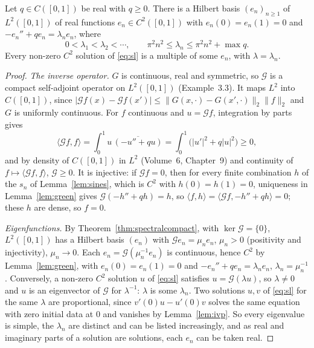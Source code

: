 \begin{theorem}\label{thm:sturm}
Let $q\in C([0,1])$ be real with $q\ge0$. There is a Hilbert basis $(e_n)_{n\ge1}$ of $L^2([0,1])$ of real functions $e_n\in C^2([0,1])$ with $e_n(0)=e_n(1)=0$ and $-e_n''+qe_n=\lambda_ne_n$, where
\[0<\lambda_1<\lambda_2<\cdots,\qquad \pi^2n^2\le\lambda_n\le\pi^2n^2+\max q.\]
Every non-zero $C^2$ solution of \eqref{eq:sl} is a multiple of some $e_n$, with $\lambda=\lambda_n$.
\end{theorem}
\begin{proof}
\emph{The inverse operator.} $G$ is continuous, real and symmetric, so $\mathcal G$ is a compact self-adjoint operator on $L^2([0,1])$ (Example~3.3). It maps $L^2$ into $C([0,1])$, since
$|\mathcal Gf(x)-\mathcal Gf(x')|\le\|G(x,\cdot)-G(x',\cdot)\|_2\|f\|_2$ and $G$ is uniformly continuous. For $f$ continuous and $u=\mathcal Gf$, integration by parts gives
\[\langle\mathcal Gf,f\rangle=\int_0^1u\,\overline{(-u''+qu)}=\int_0^1\bigl(|u'|^2+q|u|^2\bigr)\ge0,\]
and by density of $C([0,1])$ in $L^2$ (Volume~6, Chapter~9) and continuity of $f\mapsto\langle\mathcal Gf,f\rangle$, $\mathcal G\ge0$. It is injective: if $\mathcal Gf=0$, then for every finite combination $h$ of the $s_n$ of
Lemma~\ref{lem:sines}, which is $C^2$ with $h(0)=h(1)=0$, uniqueness in Lemma~\ref{lem:green} gives $\mathcal G(-h''+qh)=h$, so $\langle f,h\rangle=\langle\mathcal Gf,-h''+qh\rangle=0$; these $h$ are dense, so $f=0$.

\emph{Eigenfunctions.} By Theorem~\ref{thm:spectralcompact}, with $\ker\mathcal G=\{0\}$, $L^2([0,1])$ has a Hilbert basis $(e_n)$ with $\mathcal Ge_n=\mu_ne_n$, $\mu_n>0$ (positivity and injectivity), $\mu_n\to0$. Each $e_n=\mathcal G(\mu_n^{-1}e_n)$ is continuous,
hence $C^2$ by Lemma~\ref{lem:green}, with $e_n(0)=e_n(1)=0$ and $-e_n''+qe_n=\lambda_ne_n$, $\lambda_n=\mu_n^{-1}$. Conversely, a non-zero $C^2$ solution $u$ of \eqref{eq:sl} satisfies $u=\mathcal G(\lambda u)$, so $\lambda\ne0$ and $u$ is an
eigenvector of $\mathcal G$ for $\lambda^{-1}$: $\lambda$ is some $\lambda_n$. Two solutions $u,v$ of \eqref{eq:sl} for the same $\lambda$ are proportional, since $v'(0)u-u'(0)v$ solves the same equation with zero initial data
at $0$ and vanishes by Lemma~\ref{lem:ivp}. So every eigenvalue is simple, the $\lambda_n$ are distinct and can be listed increasingly, and as real and imaginary parts of a solution are solutions, each $e_n$ can be taken real.


\end{proof}

